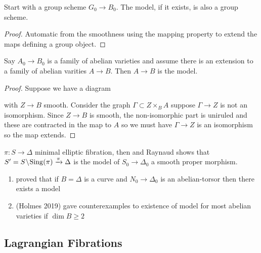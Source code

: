 \documentclass[12pt]{article}
\begin{document}
\begin{prop}
Start with a group scheme $G_0 \to B_0$. The \Neron model, if it exists, is also a group scheme.
\end{prop}

\begin{proof}
Automatic from the smoothness using the \Neron mapping property to extend the maps defining a group object.
\end{proof}

\begin{example}
Say $A_0 \to B_0$ is a family of abelian varieties and assume there is an extension to a family of abelian varities $A \to B$. Then $A \to B$ is the \Neron model.
\end{example}

\begin{proof}
Suppose we have a diagram
\begin{center}
\end{center}
with $Z \to B$ smooth. Consider the graph $\Gamma \subset Z \times_B A$ suppose $\Gamma \to Z$ is not an isomorphism. Since $Z \to B$ is smooth, the non-isomorphic part is uniruled and these are contracted in the map to $A$ so we must have $\Gamma \to Z$ is an isomorphism so the map extends. 
\end{proof}

\begin{example}
$\pi : S \to \Delta$ minimal elliptic fibration, then \Neron and Raynaud shows that $S' = S \! \setminus \! \mathrm{Sing}(\pi) \xrightarrow{\pi} \Delta$ is the \Neron model of $S_0 \to \Delta_0$ a smooth proper morphism. 
\end{example}

\begin{rmk}
\begin{enumerate}
\item \Neron proved that if $B = \Delta$ is a curve and $N_0 \to \Delta_0$ is an abelian-torsor then there exists a \Neron model
\item (Holmes 2019) gave counterexamples to existence of \Neron model for most abelian varieties if $\dim{B} \ge 2$
\end{enumerate}
\end{rmk}

\subsection{Lagrangian Fibrations}
\end{document}
